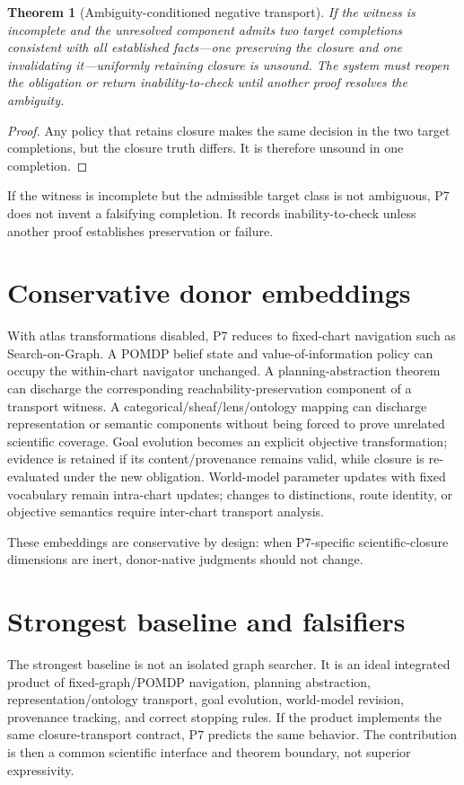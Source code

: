 \documentclass[11pt]{article}
\newtheorem{theorem}{Theorem}
\begin{document}
\begin{theorem}[Ambiguity-conditioned negative transport]
If the witness is incomplete and the unresolved component admits two target completions consistent with all established facts---one preserving the closure and one invalidating it---uniformly retaining closure is unsound. The system must reopen the obligation or return inability-to-check until another proof resolves the ambiguity.
\end{theorem}
\begin{proof}
Any policy that retains closure makes the same decision in the two target completions, but the closure truth differs. It is therefore unsound in one completion.
\end{proof}

If the witness is incomplete but the admissible target class is not ambiguous, P7 does not invent a falsifying completion. It records inability-to-check unless another proof establishes preservation or failure.

\section{Conservative donor embeddings}
With atlas transformations disabled, P7 reduces to fixed-chart navigation such as Search-on-Graph. A POMDP belief state and value-of-information policy can occupy the within-chart navigator unchanged. A planning-abstraction theorem can discharge the corresponding reachability-preservation component of a transport witness. A categorical/sheaf/lens/ontology mapping can discharge representation or semantic components without being forced to prove unrelated scientific coverage. Goal evolution becomes an explicit objective transformation; evidence is retained if its content/provenance remains valid, while closure is re-evaluated under the new obligation. World-model parameter updates with fixed vocabulary remain intra-chart updates; changes to distinctions, route identity, or objective semantics require inter-chart transport analysis.

These embeddings are conservative by design: when P7-specific scientific-closure dimensions are inert, donor-native judgments should not change.

\section{Strongest baseline and falsifiers}
The strongest baseline is not an isolated graph searcher. It is an ideal integrated product of fixed-graph/POMDP navigation, planning abstraction, representation/ontology transport, goal evolution, world-model revision, provenance tracking, and correct stopping rules. If the product implements the same closure-transport contract, P7 predicts the same behavior. The contribution is then a common scientific interface and theorem boundary, not superior expressivity.
\end{document}
